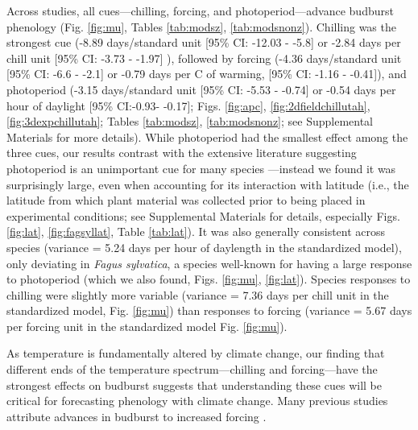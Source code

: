 \documentclass{article}
\begin{document}
\par Across studies, all cues---chilling, forcing, and photoperiod---advance budburst phenology (Fig. \ref{fig:mu}, Tables \ref{tab:modsz}, \ref{tab:modsnonz}). Chilling was the strongest cue (-8.89 days/standard unit [95\% CI: -12.03 - -5.8] or -2.84 days per chill unit [95\% CI: -3.73 - -1.97] ), followed by forcing (-4.36 days/standard unit [95\% CI: -6.6 - -2.1] or -0.79 days per \degree C of warming, [95\% CI: -1.16 - -0.41]), and photoperiod (-3.15 days/standard unit [95\% CI: -5.53 - -0.74] or -0.54 days per hour of daylight [95\% CI:-0.93-  -0.17]; Figs. \ref{fig:apc}, \ref{fig:2dfieldchillutah}, \ref{fig:3dexpchillutah}; Tables \ref{tab:modsz}, \ref{tab:modsnonz}; see Supplemental Materials for more details). While photoperiod had the smallest effect among the three cues, our results contrast with the extensive literature suggesting photoperiod is an unimportant cue for many species \emph{\citep{zohner2016,koerner2010a}}---instead we found it was surprisingly large, even when accounting for its interaction with latitude (i.e., the latitude from which plant material was collected prior to being placed in experimental conditions; see Supplemental Materials for details, especially Figs. \ref{fig:lat}, \ref{fig:fagsyllat}, Table \ref{tab:lat}). It was also generally consistent across species (variance = 5.24 days per hour of daylength in the standardized model), only deviating in \emph{Fagus sylvatica}, a species well-known for having a large response to photoperiod (which we also found, Figs. \ref{fig:mu}, \ref{fig:lat}). Species responses to chilling were slightly more variable (variance = 7.36 days per chill unit in the standardized model, Fig. \ref{fig:mu}) than responses to forcing (variance = 5.67 days per forcing unit in the standardized model Fig. \ref{fig:mu}).
\par As temperature is fundamentally altered by climate change, our finding that different ends of the temperature spectrum---chilling and forcing---have the strongest effects on budburst suggests that understanding these cues will be critical for forecasting phenology with climate change. Many previous studies attribute advances in budburst to increased forcing \emph{\citep{menzel2006,harrington2015,Basler:2014aa,bradley1999}}.
\end{document}
